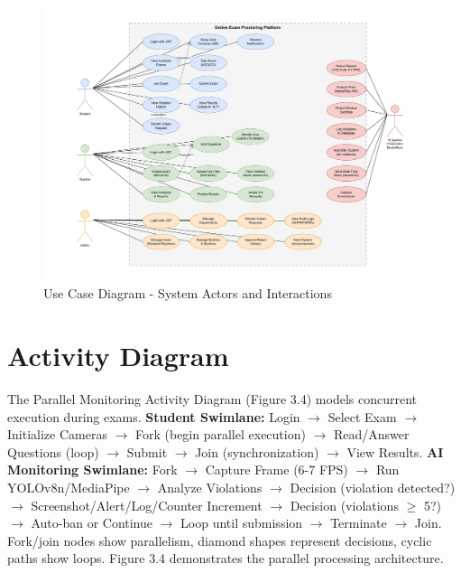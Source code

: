 \begin{figure}[ht]
    \centering
    \includegraphics[width=\textwidth]{Chap3/usecase}
    \caption{Use Case Diagram - System Actors and Interactions}
    \label{fig:usecase}
\end{figure}

\section{Activity Diagram}

The Parallel Monitoring Activity Diagram (Figure 3.4) models concurrent execution during exams. \textbf{Student Swimlane:} Login $\rightarrow$ Select Exam $\rightarrow$ Initialize Cameras $\rightarrow$ Fork (begin parallel execution) $\rightarrow$ Read/Answer Questions (loop) $\rightarrow$ Submit $\rightarrow$ Join (synchronization) $\rightarrow$ View Results. \textbf{AI Monitoring Swimlane:} Fork $\rightarrow$ Capture Frame (6-7 FPS) $\rightarrow$ Run YOLOv8n/MediaPipe $\rightarrow$ Analyze Violations $\rightarrow$ Decision (violation detected?) $\rightarrow$ Screenshot/Alert/Log/Counter Increment $\rightarrow$ Decision (violations $\geq$ 5?) $\rightarrow$ Auto-ban or Continue $\rightarrow$ Loop until submission $\rightarrow$ Terminate $\rightarrow$ Join. Fork/join nodes show parallelism, diamond shapes represent decisions, cyclic paths show loops. Figure 3.4 demonstrates the parallel processing architecture.

